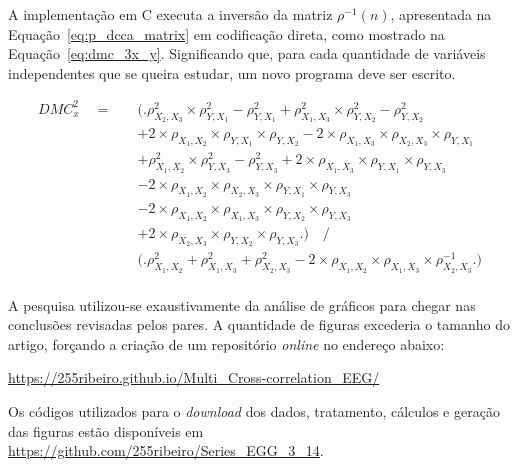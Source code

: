 A implementação em C executa a inversão da matriz $\rho^{-1}(n)$, apresentada na Equação~\ref{eq:p_dcca_matrix} em codificação direta, como mostrado na Equação~\ref{eq:dmc_3x_y}. Significando que, para cada quantidade de variáveis independentes que se queira estudar, um novo programa deve ser escrito.

\begin{equation}
    \begin{split}
    DMC_{x}^{2} \quad = \quad & \Big( \Big. \rho^{2}_{X_{2},X_{3}} \times \rho^{2}_{Y,X_{1}}- \rho^{2}_{Y,X_{1}} + \rho^{2}_{X_{1},X_{3}}\times \rho^{2}_{Y,X_{2}}-\rho^{2}_{Y,X_{2}} \\
    &+ 2 \times \rho_{X_{1},X_{2}} \times \rho_{Y,X_{1}} \times \rho_{Y,X_{2}}   - 2 \times \rho_{X_{1},X_{3}} \times \rho_{X_{2},X_{3}} \times \rho_{Y,X_{1}} \\
    &+ \rho^{2}_{X_{1},X_{2}} \times \rho^{2}_{Y,X_{3}}-\rho^{2}_{Y,X_{3}} + 2 \times \rho_{X_{1},X_{3}} \times \rho_{Y,X_{1}} \times \rho_{Y,X_{3}} \\ 
    &- 2 \times \rho_{X_{1},X_{2}} \times \rho_{X_{2},X_{3}} \times \rho_{Y,X_{1}} \times \rho_{Y,X_{3}} \\
    &- 2 \times \rho_{X_{1},X_{2}} \times \rho_{X_{1},X_{3}} \times \rho_{Y,X_{2}} \times \rho_{Y,X_{3}} \\
    &+ 2 \times \rho_{X_{2},X_{3}} \times \rho_{Y,X_{2}} \times \rho_{Y,X_{3}} \Big. \Big)    \quad \Big/ \\
    & \Big( \Big. \rho^{2}_{X_{1},X_{2}} + \rho^{2}_{X_{1},X_{3}} + \rho^{2}_{X_{2},X_{3}} - 2 \times \rho_{X_{1},X_{2}} \times \rho_{X_{1},X_{3}} \times \rho_{X_{2},X_{3}}^{-1}\Big. \Big)  \\
    \end{split}
    \label{eq:dmc_3x_y} 
    \end{equation}

A pesquisa utilizou-se exaustivamente da análise de gráficos para chegar nas conclusões revisadas pelos pares. A quantidade de figuras excederia o tamanho do artigo, forçando a criação de um repositório \emph{online} no endereço abaixo:

\begin{center}
	\url{https://255ribeiro.github.io/Multi_Cross-correlation_EEG/}
\end{center}

Os códigos utilizados para o \emph{download} dos dados, tratamento, cálculos e geração das figuras estão disponíveis em \url{https://github.com/255ribeiro/Series_EGG_3_14}.

